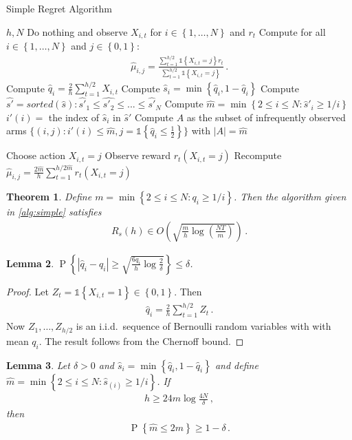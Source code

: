 \documentclass{article}
\newcommand{\set}[1]{\left\{#1\right\}}
\newcommand{\ind}[1]{\mathds{1}\!\!\set{#1}}
\newcommand{\eq}[1]{\begin{align*}#1\end{align*}}
\renewcommand{\P}[1]{\operatorname{P}\left\{#1\right\}}
\theoremstyle{plain}
\newtheorem{theorem}{Theorem}
\newtheorem{lemma}[theorem]{Lemma}
\theoremstyle{definition}
\begin{document}
\begin{algorithm}[H]
\caption{Simple Regret Algorithm}\label{alg:simple}
\begin{algorithmic}[1]
 $h, N$
\State Do nothing and observe $X_{i,t}$ for $i \in \set{1,\ldots,N}$ and $r_t$
\EndFor
\State Compute for all $i \in \set{1,\ldots,N}$ and $j \in \set{0,1}$:
\eq{
\hat \mu_{i,j} = \frac{\sum_{t=1}^{h/2} \ind{X_{i,t} = j} r_t}{\sum_{t=1}^{h/2} \ind{X_{i,t} = j}}\,.
}
\State Compute $\hat q_i = \frac{2}{h} \sum_{t=1}^{h/2} X_{i,t}$
\State Compute $\hat s_i = \min\set{\hat q_i, 1 - \hat q_i}$
\State Compute $\hat{s'} = sorted(\hat{s}) : \hat{s'}_1 \leq \hat{s'_2} \leq ... \leq \hat{s'}_N$
\State Compute $\hat m = \min\set{2 \leq i \leq N : \hat s'_{i} \geq 1/i}$
\State $i'(i) = $ the index of $\hat s_i$ in $\hat s'$
\State Compute $A$ as the subset of infrequently observed arms $\{(i,j):i'(i) \leq \hat m, j = \ind{\hat q_{i} \leq \frac{1}{2}} \}$ with $|A| = \hat m$

\State Choose action $X_{i,t} = j$
\State Observe reward $r_t(X_{i,t}=j)$
\EndFor
\State Recompute $\hat \mu_{i,j} = \frac{2\hat m}{h} \sum_{t=1}^{ h/2\hat m} r_t(X_{i,t}=j)$ 
\EndFor
\end{algorithmic}
\end{algorithm}

\begin{theorem}\label{thm:simple-regret}
Define $m = \min\set{2 \leq i \leq N : q_i \geq 1/i}$.
Then the algorithm given in \cref{alg:simple} satisfies
\eq{
R_s(h) \in O\left(\sqrt{\frac{m}{h} \log \left(\frac{NT}{m}\right)}\right)\,.
}
\end{theorem}

\begin{lemma}\label{lem:conc1}
$\displaystyle \P{\left|\hat q_i - q_i\right| \geq \sqrt{\frac{6q_i}{h} \log \frac{2}{\delta}}} \leq \delta$.
\end{lemma}

\begin{proof}
Let $Z_t = \ind{X_{i,t} = 1} \in \set{0,1}$.
Then
\eq{
\hat q_i = \frac{2}{h} \sum_{t=1}^{h/2} Z_t\,.
}
Now $Z_1,\ldots,Z_{h/2}$ is an i.i.d.\ sequence of Bernoulli random variables with with mean $q_i$. The result follows from the Chernoff bound.
\end{proof}

\begin{lemma}\label{lem:conc2}
Let $\delta >0$ and $\hat s_i = \min\set{\hat q_i, 1 - \hat q_i}$ and
define $\hat m = \min\set{2 \leq i \leq N : \hat s_{(i)} \geq 1/i}$.
If
\eq{
h \geq 24m \log\frac{4N}{\delta}\,,
}
then
\eq{
\P{\hat m \leq 2m} \geq 1 - \delta\,.
}
\end{lemma}
\end{document}

